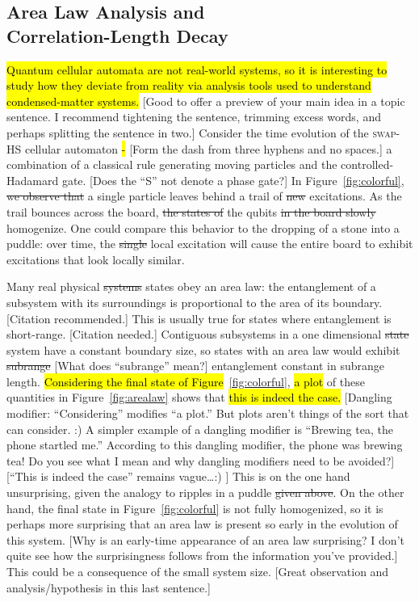 \documentclass[11pt]{article}
\newcommand{\nicole}[1]{{\color{Green}#1}}
\begin{document}
\begin{multicols}{2}
\subsection*{Area Law Analysis and\\ Correlation-Length Decay}

\hl{Quantum cellular automata are not real-world systems, so it is interesting to study how they deviate from reality via analysis tools used to understand condensed-matter systems.}
\nicole{[Good to offer a preview of your main idea in a topic sentence. I recommend tightening the sentence, trimming excess words, and perhaps splitting the sentence in two.]}
Consider the time evolution of \nicole{the} \textsc{swap-HS} cellular automaton \hl{-} 
\nicole{[Form the dash from three hyphens and no spaces.]}
a combination of a classical rule generating moving particles and the controlled-Hadamard gate. 
\nicole{[Does the ``S'' not denote a phase gate?]}
In Figure~\ref{fig:colorful}\nicole{,} \sout{we observe that} a single particle leaves behind a trail of \sout{new} excitations. As the trail bounces across the board\nicole{,} \sout{the states of} the qubits \sout{in the board slowly} homogenize. One could compare this \nicole{behavior} to \nicole{the} dropping \nicole{of} a stone into a puddle: over time\nicole{,} the \sout{single} local excitation will cause the entire board to exhibit excitations that look locally similar.

Many real physical \sout{systems} \nicole{states} obey an area law: the entanglement of a subsystem with its surroundings is proportional to the area of its boundary. 
\nicole{[Citation recommended.]}
This is usually true for states where entanglement is short-range. \nicole{[Citation needed.]} Contiguous subsystems in a one dimensional \sout{state} \nicole{system} have a constant boundary size, so states with an area law would exhibit \sout{subrange} \nicole{[What does ``subrange'' mean?]} entanglement constant in subrange length. \hl{Considering the final state of Figure}~\ref{fig:colorful}, \hl{a plot} of these quantities in Figure~\ref{fig:arealaw} shows that \hl{this is indeed the case.} 
\nicole{[Dangling modifier: ``Considering'' modifies ``a plot.'' But plots aren't things of the sort that can consider. :) A simpler example of a dangling modifier is ``Brewing tea, the phone startled me.'' According to this dangling modifier, the phone was brewing tea! Do you see what I mean and why dangling modifiers need to be avoided?]
[``This is indeed the case'' remains vague\ldots :) ]}
This is on the one hand unsurprising\nicole{,} given the analogy to ripples in a puddle \sout{given above}. On the other hand, the final state in Figure~\ref{fig:colorful} is not fully homogenized, so it is perhaps more surprising that an area law is present so early in the evolution of this system. 
\nicole{[Why is an early-time appearance of an area law surprising? I don't quite see how the surprisingness follows from the information you've provided.]}
This could be a consequence of the small system size.
\nicole{[Great observation and analysis/hypothesis in this last sentence.]}





\end{multicols}
\end{document}
